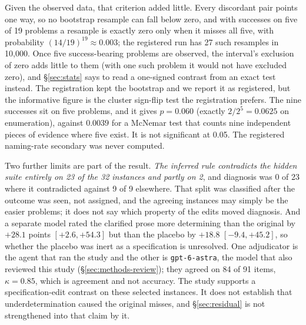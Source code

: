 Given the observed data, that criterion added little. Every discordant pair points one way, so no
bootstrap resample can fall below zero, and with successes on five of 19 problems a resample is
exactly zero only when it misses all five, with probability $(14/19)^{19} \approx 0.003$; the
registered run has 27 such resamples in 10{,}000. Once five success-bearing problems are observed,
the interval's exclusion of zero adds little to them (with one such problem it would not have
excluded zero), and \S\ref{sec:stats} says to read a one-signed contrast from an exact test
instead. The registration kept the bootstrap and we report it as registered, but the informative
figure is the cluster sign-flip test the registration prefers. The nine successes sit on five
problems, and it gives $p = 0.060$ (exactly $2/2^5 = 0.0625$ on enumeration), against $0.0039$ for
a McNemar test that counts nine independent pieces of evidence where five exist. It is not
significant at 0.05. The registered naming-rate secondary was never computed.

Two further limits are part of the result. \emph{The inferred rule contradicts the hidden suite
entirely on 23 of the 32 instances and partly on 2}, and diagnosis was 0 of 23 where it
contradicted against 9 of 9 elsewhere. That split was classified after the outcome was seen, not
assigned, and the agreeing instances may simply be the easier problems; it does not say which
property of the edits moved diagnosis. And a separate model rated the clarified prose more
determining than the original by $+28.1$ points $[+2.6, +54.3]$ but than the placebo by $+18.8$
$[-9.4, +45.2]$, so whether the placebo was inert as a specification is unresolved. One
adjudicator is the agent that ran the study and the other is \texttt{gpt-6-astra}, the model that
also reviewed this study (\S\ref{sec:methods-review}); they agreed on 84 of 91 items,
$\kappa = 0.85$, which is agreement and not accuracy. The study supports a specification-edit
contrast on these selected instances. It does not establish that underdetermination caused the
original misses, and \S\ref{sec:residual} is not strengthened into that claim by it.

